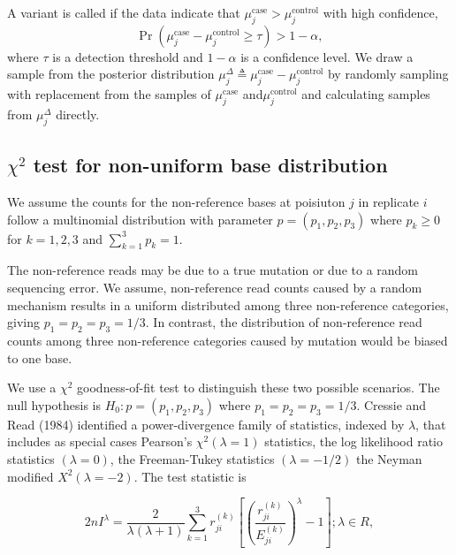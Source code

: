 \documentclass[11pt,reqno]{amsart}
\begin{document}
A variant is called if the data indicate that $\mu_j^{\text{case}} > \mu_j^{\text{control}}$ with high confidence,
\begin{equation}
	\Pr( \mu_j^{\text{case}} - \mu_j^{\text{control}} \geq \tau ) > 1-\alpha,
\end{equation}
where $\tau$ is a detection threshold and $1-\alpha$ is a confidence level. We draw a sample from the posterior distribution $\mu_j^{\Delta} \triangleq \mu_j^{\text{case}} - \mu_j^{\text{control}}$ by randomly sampling with replacement from the samples of $\mu_j^{\text{case}}$ and$\mu_j^{\text{control}}$ and calculating samples from $\mu_j^{\Delta}$ directly.



\subsection{$\chi^2$ test for non-uniform base distribution}

We assume the counts for the non-reference bases at poisiuton $j$ in replicate $i$ follow a multinomial distribution with parameter  $p = (p_1, p_2, p_3)$ where $p_k \geq 0$ for $k =1, 2, 3$ and $\sum_{k=1}^3 p_k = 1$.

The non-reference reads may be due to a true mutation or due to a random sequencing error. We assume, non-reference read counts caused by a random mechanism results in a uniform distributed among three non-reference categories, giving $p_1=p_2=p_3=1/3$. In contrast, the distribution of non-reference read counts among three non-reference categories caused by mutation would be biased to one base. 

We use a $\chi^2$ goodness-of-fit test to distinguish these two possible scenarios. The null hypothesis is $H_0: p = (p_1, p_2, p_3)$ where $p_1=p_2=p_3=1/3$. Cressie and Read (1984) identified a power-divergence family of statistics, indexed by $\lambda$, that includes as special cases Pearson's $\chi^2 (\lambda = 1)$ statistics, the log likelihood ratio statistics $(\lambda = 0)$, the Freeman-Tukey statistics $(\lambda = -1/2)$ the Neyman modified $X^2 (\lambda = -2)$. The test statistic is

\begin{equation}
 2nI^\lambda = \frac{2}{\lambda(\lambda+1)}\sum_{k=1}^3 r_{ji}^{(k)} \left[\left(\frac{r_{ji}^{(k)}}{E_{ji}^{(k)}}\right)^\lambda-1\right];\lambda \in R,
\end{equation}
\end{document}
